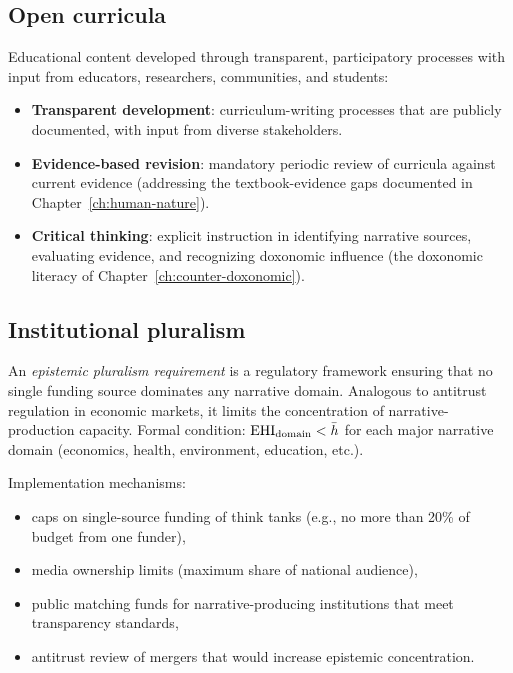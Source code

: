 \subsection{Open curricula}

Educational content developed through transparent, participatory processes with input from educators, researchers, communities, and students:
\begin{itemize}[nosep]
  \item \textbf{Transparent development}: curriculum-writing processes that are publicly documented, with input from diverse stakeholders.
  \item \textbf{Evidence-based revision}: mandatory periodic review of curricula against current evidence (addressing the textbook-evidence gaps documented in Chapter~\ref{ch:human-nature}).
  \item \textbf{Critical thinking}: explicit instruction in identifying narrative sources, evaluating evidence, and recognizing doxonomic influence (the doxonomic literacy of Chapter~\ref{ch:counter-doxonomic}).
\end{itemize}

\subsection{Institutional pluralism}

\begin{definition}
\label{def:pluralism}
An \emph{epistemic pluralism requirement} is a regulatory framework ensuring that no single funding source dominates any narrative domain.
Analogous to antitrust regulation in economic markets, it limits the concentration of narrative-production capacity.
Formal condition: $\mathrm{EHI}_{\text{domain}} < \bar{h}$ for each major narrative domain (economics, health, environment, education, etc.).
\end{definition}

Implementation mechanisms:
\begin{itemize}[nosep]
  \item caps on single-source funding of think tanks (e.g., no more than 20\% of budget from one funder),
  \item media ownership limits (maximum share of national audience),
  \item public matching funds for narrative-producing institutions that meet transparency standards,
  \item antitrust review of mergers that would increase epistemic concentration.
\end{itemize}


